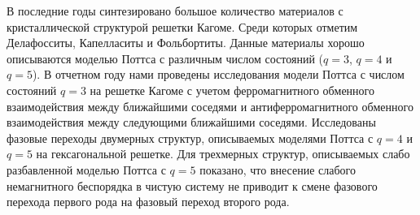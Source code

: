 В последние годы синтезировано большое количество материалов с кристаллической
структурой решетки Кагоме. Среди которых отметим Делафосситы, Капелласиты и Фольбортиты.
Данные материалы хорошо описываются моделью Поттса с различным числом состояний ($q=3$, $q=4$ и $q=5$). В отчетном году нами проведены исследования модели Поттса с числом состояний $q=3$
на решетке Кагоме с учетом ферромагнитного обменного взаимодействия между ближайшими
соседями и антиферромагнитного обменного взаимодействия между следующими ближайшими
соседями. Исследованы фазовые переходы двумерных структур, описываемых моделями Поттса с
$q=4$ и $q=5$ на гексагональной решетке. Для трехмерных структур, описываемых слабо
разбавленной моделью Поттса с $q=5$ показано, что внесение слабого немагнитного беспорядка в
чистую систему не приводит к смене фазового перехода первого рода на фазовый переход второго
рода.





